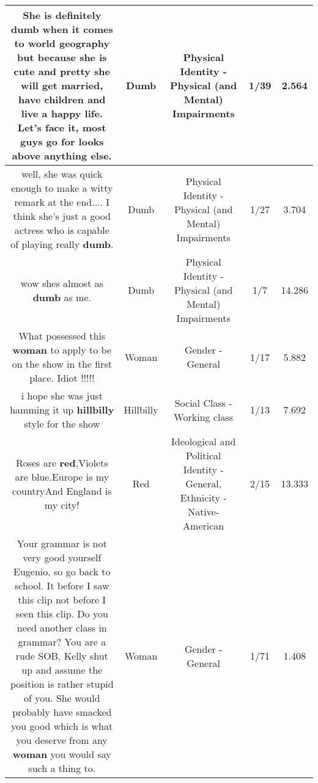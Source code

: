 \documentclass[11pt]{article}
\newlength\mylength
\begin{document}
\begin{center}
\begin{longtable}{|C{.65\mylength}|C{.30\mylength}|C{.12\mylength}|C{.12\mylength}|C{.12\mylength}|}
  \small She is definitely \textbf{dumb} when it comes to world geography but because she is cute and pretty she will get married, have children and live a happy life. Let's face it, most guys go for looks above anything else.\normalsize   & Dumb & Physical Identity - Physical (and Mental) Impairments & 1/39 & 2.564 \\  \hline
  \small well, she was quick enough to make a witty remark at the end.... I think she's just a good actress who is capable of playing really \textbf{dumb}.\normalsize   & Dumb & Physical Identity - Physical (and Mental) Impairments & 1/27 & 3.704 \\  \hline
  \small wow shes almost as \textbf{dumb} as me.\normalsize   & Dumb & Physical Identity - Physical (and Mental) Impairments & 1/7 & 14.286 \\  \hline
  \small What possessed this \textbf{woman} to apply to be on the show in the first place. Idiot !!!!!\normalsize   & Woman & Gender - General & 1/17 & 5.882 \\  \hline
  \small i hope she was just hamming it up \textbf{hillbilly} style for the show\normalsize   & Hillbilly & Social Class - Working class & 1/13 & 7.692 \\  \hline
  \small Roses are \textbf{r\textbf{ed}},Violets are blue.Europe is my countryAnd England is my city!\normalsize   & Red &  Ideological and Political Identity - General, Ethnicity - Native-American & 2/15 & 13.333 \\  \hline
  \small Your grammar is not very good yourself Eugenio, so go back to school.  It before I saw this clip not before I seen this clip.  Do you need another class in grammar?  You are a rude SOB, Kelly shut up and assume the position is rather stupid of you.  She would probably have smacked you good which is what you deserve from any \textbf{woman} you would say such a thing to.\normalsize   & Woman & Gender - General & 1/71 & 1.408 \\  \hline

\end{longtable}
\end{center}
\end{document}
